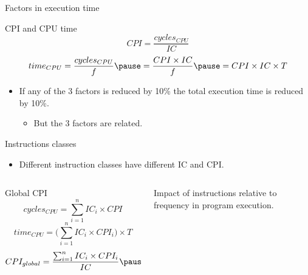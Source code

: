 \begin{frame}[t]{Factors in execution time}
\begin{block}{CPI and CPU time}
\begin{displaymath}
CPI=\frac{cycles_{CPU}}{IC}
\end{displaymath}
\pause
\begin{displaymath}
time_{CPU}=
\frac{cycles_{CPU}}{f} \pause =
\frac{CPI \times IC}{f} \pause =
CPI \times IC \times T
\end{displaymath}
\end{block}
\begin{itemize}
  \item If any of the 3 factors is reduced by 10\%
        the total execution time is reduced by 10\%.
    \begin{itemize}
      \item \alert{But the 3 factors are related}.
    \end{itemize}
\end{itemize}
\end{frame}

\begin{frame}[t]{Instructions classes}
\begin{itemize}
  \item Different instruction classes have different IC and CPI.
\end{itemize}
\begin{columns}
\begin{column}{.7\textwidth}
\begin{block}{Global CPI}
\begin{displaymath}
cycles_{CPU}=\sum_{i=1}^n IC_i \times CPI
\end{displaymath}
\pause
\begin{displaymath}
time_{CPU} =
\big( \sum_{i=1}^n IC_i \times CPI_i \big) \times T
\end{displaymath}
\pause
\begin{displaymath}
CPI_{global} = 
\frac
{\sum_{i=1}^n IC_i \times CPI_i}
{IC}
\pause =
\sum_{i=1}^n \frac{IC_i}{IC} \times CPI_i
\end{displaymath}
\end{block}
\end{column}
\begin{column}{.3\textwidth}
\pause
\alert{Impact of instructions relative to frequency in program execution}.
\end{column}
\end{columns}
\end{frame}

